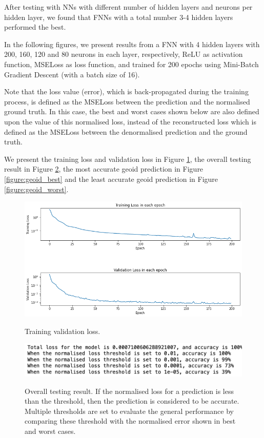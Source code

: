 After testing with NNs with different number of hidden layers and neurons per hidden layer, we found that FNNs with a total number 3-4 hidden layers performed the best.

In the following figures, we present results from a FNN with 4 hidden layers with 200, 160, 120 and 80 neurons in each layer, respectively, ReLU as activation function, MSELoss as loss function, and trained for 200 epochs using Mini-Batch Gradient Descent (with a batch size of 16).

Note that the loss value (error), which is back-propagated during the training process, is defined as the MSELoss between the prediction and the normalised ground truth. In this case, the best and worst cases shown below are also defined upon the value of this normalised loss, instead of the reconstructed loss which is defined as the MSELoss between the denormalised prediction and the ground truth.

We present the training loss and validation loss in Figure \ref{figure:geoid_losses}, the overall testing result in Figure \ref{figure:geoid_testing},  the most accurate geoid prediction in Figure \ref{figure:geoid_best} and the least accurate geoid prediction in Figure \ref{figure:geoid_worst}.

\begin{figure}[H]
    \caption{Training validation loss.}
    \includegraphics[scale=0.6]{figures/geoid_images/Geoid_trainingData.png}
    \label{figure:geoid_losses}
\end{figure}

\begin{figure}[H]
    \caption{Overall testing result. If the normalised loss for a prediction is less than the threshold, then the prediction is considered to be accurate. Multiple thresholds are set to evaluate the general performance by comparing these threshold with the normalised error shown in best and worst cases.}
    \includegraphics[scale=0.8]{figures/geoid_images/Geoid_OverallTesting.png}
    \label{figure:geoid_testing}
\end{figure}

